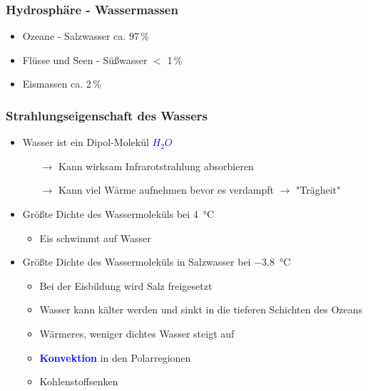 \begin{frame}
	\frametitle{Hydrosphäre - Wassermassen}
	\begin{itemize}
		\item Ozeane - Salzwasser ca. 97\,\%
		\item Flüsse und Seen - Süßwasser $<$ 1\,\%
		\item Eismassen ca. 2\,\% %
	\end{itemize}
\end{frame}


\begin{frame}
	\frametitle{Strahlungseigenschaft des Wassers} %
	\begin{itemize}
		\item Wasser ist ein Dipol-Molekül \textcolor{blue}{$H_2O$}
		\begin{itemize}			
			\item[$\rightarrow$] Kann wirksam Infrarotstrahlung absorbieren
			\item[$\rightarrow$] Kann viel Wärme aufnehmen bevor es verdampft $\rightarrow$ "Trägheit"
		\end{itemize}
		
		\item<2-> Größte Dichte des Wassermoleküls bei \SI{4}{\degreeCelsius}
		\begin{itemize}
			\item<2->[$\rightarrow$] Eis schwimmt auf Wasser
		\end{itemize}		
		\item<3->Größte Dichte des Wassermoleküls in Salzwasser bei \SI{-3,8}{\degreeCelsius}
		\begin{itemize}
			\item<3-> [] Bei der Eisbildung wird Salz freigesetzt
			\item<3-> [$\rightarrow$] Wasser kann kälter werden und sinkt in die tieferen Schichten des Ozeans
			\item<3-> [$\rightarrow$] Wärmeres, weniger dichtes Wasser steigt auf
			\item<3-> [] \textbf{\textcolor{blue}{Konvektion}} in den Polarregionen 
			\item<3-> [$\rightarrow$] Kohlenstoffsenken
		\end{itemize}
	\end{itemize}


\end{frame}

